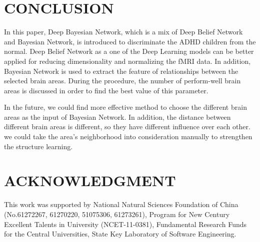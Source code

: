 \documentclass[10pt,twocolumn,letterpaper]{article}
\begin{document}
\section{CONCLUSION}
In this paper, Deep Bayesian Network, which is a mix of Deep  Belief Network and Bayesian Network, is introduced to discriminate the ADHD children from the normal. Deep Belief Network as a one of the Deep Learning models can be better applied for reducing dimensionality and normalizing the fMRI data. In addition, Bayesian Network is used to extract the feature of relationships between the selected brain areas. During the procedure, the number of perform-well brain areas is discussed in order to find the best value of this parameter.


In the future, we could find more effective method to choose the different brain areas as the input of Bayesian Network. In addition, the distance between different brain areas is different, so they have different influence over each other. we could take  the area's neighborhood into consideration manually to strengthen the structure learning.



\section{ACKNOWLEDGMENT}

This work was supported by National Natural Sciences
Foundation of China (No.61272267, 61270220, 51075306,
61273261), Program for New Century Excellent Talents in
University (NCET-11-0381), Fundamental Research Funds for
the Central Universities, State Key Laboratory of Software
Engineering.







{\small


}
\end{document}
